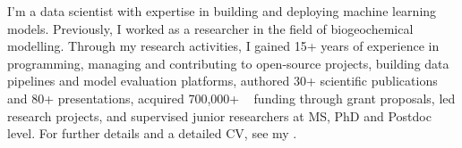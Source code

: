 \documentclass[
	a4paper,
]{fortysecondscv}
\begin{document}
\makefrontsidebar


I'm a data scientist with expertise in building and deploying machine learning models. Previously, I worked as a researcher in the field of biogeochemical modelling. Through my research activities, I gained 15+ years of experience in programming, managing and contributing to open-source projects, building data pipelines and model evaluation platforms, authored 30+ scientific publications and 80+  presentations, acquired 700,000+ \texteuro~ funding through grant proposals, led research projects, and supervised junior researchers at MS, PhD and Postdoc level. For further details and a detailed CV, see my \href{https://sites.google.com/view/onur-kerimoglu}{\color{pblue}{website}}.



           
\end{document}
